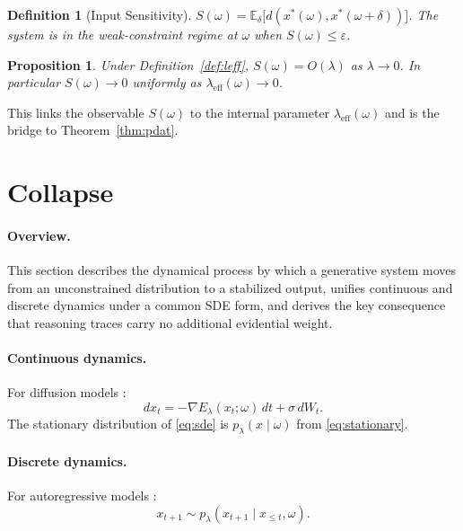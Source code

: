 \documentclass[twocolumn,10pt]{article}
\theoremstyle{thmstyle}
\newtheorem{proposition}[theorem]{Proposition}
\theoremstyle{defstyle}
\newtheorem{definition}[theorem]{Definition}
\newcommand{\leff}{\lambda_{\mathrm{eff}}}
\begin{document}
\begin{definition}[Input Sensitivity]
\label{def:sensitivity}
$S(\omega) = \mathbb{E}_{\delta}\!\bigl[d(x^*(\omega), x^*(\omega+\delta))\bigr]$.
The system is in the \emph{weak-constraint regime} at $\omega$ when
$S(\omega) \leq \varepsilon$.
\end{definition}

\begin{proposition}
\label{prop:sensitivity-scaling}
Under Definition~\ref{def:leff}, $S(\omega) = O(\lambda)$ as $\lambda\to
0$. In particular $S(\omega)\to 0$ uniformly as $\leff(\omega)\to 0$.
\end{proposition}

This links the observable $S(\omega)$ to the internal parameter
$\leff(\omega)$ and is the bridge to Theorem~\ref{thm:pdat}.

\section{Collapse}
\label{sec:collapse}

\paragraph{Overview.}
This section describes the dynamical process by which a generative
system moves from an unconstrained distribution to a stabilized output,
unifies continuous and discrete dynamics under a common SDE form, and
derives the key consequence that reasoning traces carry no additional
evidential weight.

\paragraph{Continuous dynamics.}
For diffusion models \citep{ho2020ddpm,song2021score}:
\begin{equation}
  dx_t = -\nabla E_\lambda(x_t;\omega)\,dt + \sigma\,dW_t.
  \label{eq:sde}
\end{equation}
The stationary distribution of \eqref{eq:sde} is $p_\lambda(x\mid\omega)$
from \eqref{eq:stationary}.

\paragraph{Discrete dynamics.}
For autoregressive models \citep{brown2020gpt3,vaswani2017attention}:
\begin{equation}
  x_{t+1} \sim p_\lambda(x_{t+1}\mid x_{\leq t}, \omega).
  \label{eq:ar}
\end{equation}
\end{document}
